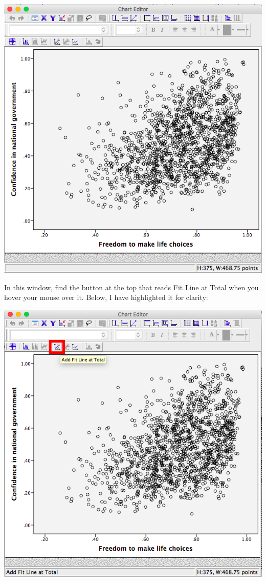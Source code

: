 \documentclass[
]{book}
\begin{document}
\includegraphics{img/3.4.26.png}

In this window, find the button at the top that reads {Fit Line at Total} when you hover your mouse over it. Below, I have highlighted it for clarity:

\includegraphics{img/3.4.27.png}
\end{document}

